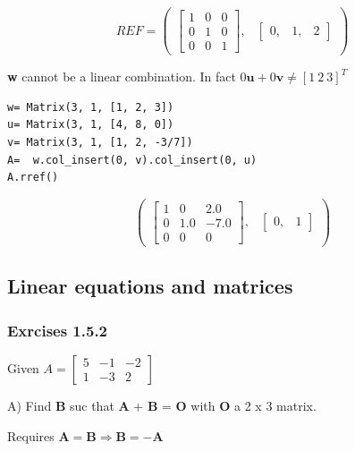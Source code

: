 \begin{equation}
REF= \begin{pmatrix}\left[\begin{matrix}1 & 0 & 0\\0 & 1 & 0\\0 & 0 & 1\end{matrix}\right], & \begin{bmatrix}0, & 1, & 2\end{bmatrix}\end{pmatrix}
\end{equation}

\textbf{w} cannot be a linear combination. In fact
$0\mathbf{u} + 0\mathbf{v} \neq [1\ 2\ 3]^T$

\begin{verbatim}
w= Matrix(3, 1, [1, 2, 3])
u= Matrix(3, 1, [4, 8, 0])
v= Matrix(3, 1, [1, 2, -3/7])
A=  w.col_insert(0, v).col_insert(0, u)
A.rref()
\end{verbatim}

\begin{equation}\label{eq:}
\begin{pmatrix}\left[\begin{matrix}1 & 0 & 2.0\\0 & 1.0 & -7.0\\0 & 0 & 0\end{matrix}\right], & \begin{bmatrix}0, & 1\end{bmatrix}\end{pmatrix}
\end{equation}

\subsection{Linear equations and matrices}

\subsubsection{Exrcises 1.5.2}

Given $A = \left[\begin{matrix}5 & -1 & -2\\1 & -3 & 2\end{matrix}\right]$

A) Find \textbf{B} suc that \textbf{A} + \textbf{B} = \textbf{O} with \textbf{O}
a 2 x 3 matrix.

Requires $\mathbf{A} = \mathbf{B} \Rightarrow \mathbf{B} = -\mathbf{A}$

